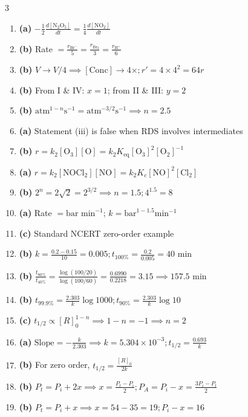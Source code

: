 \documentclass[11pt, a4paper]{article}
\begin{document}
\begin{multicols}{3}
\begin{enumerate}
    \item \textbf{(a)} $-\frac{1}{2}\frac{d[\text{N}_2\text{O}_5]}{dt} = \frac{1}{4}\frac{d[\text{NO}_2]}{dt}$
    \item \textbf{(b)} Rate $= \frac{r_{\text{Br}^-}}{5} = \frac{r_{\text{Br}_2}}{3} = \frac{r_{\text{H}^+}}{6}$
    \item \textbf{(b)} $V \to V/4 \implies [\text{Conc}] \to 4\times; r' = 4 \times 4^2 = 64r$
    \item \textbf{(b)} From I \& IV: $x=1$; from II \& III: $y=2$
    \item \textbf{(b)} $\text{atm}^{1-n}\text{s}^{-1} = \text{atm}^{-3/2}\text{s}^{-1} \implies n = 2.5$
    \item \textbf{(a)} Statement (iii) is false when RDS involves intermediates
    \item \textbf{(b)} $r = k_2[\text{O}_3][\text{O}] = k_2 K_{\text{eq}}[\text{O}_3]^2[\text{O}_2]^{-1}$
    \item \textbf{(a)} $r = k_2[\text{NOCl}_2][\text{NO}] = k_2 K_c[\text{NO}]^2[\text{Cl}_2]$
    \item \textbf{(b)} $2^n = 2\sqrt{2} = 2^{3/2} \implies n = 1.5; 4^{1.5} = 8$
    \item \textbf{(a)} Rate $= \text{bar min}^{-1}$; $k = \text{bar}^{1-1.5}\text{min}^{-1}$
    \item \textbf{(c)} Standard NCERT zero-order example
    \item \textbf{(b)} $k = \frac{0.2-0.15}{10} = 0.005; t_{100\%} = \frac{0.2}{0.005} = 40\text{ min}$
    \item \textbf{(b)} $\frac{t_{80\%}}{t_{40\%}} = \frac{\log(100/20)}{\log(100/60)} = \frac{0.6990}{0.2218} = 3.15 \implies 157.5\text{ min}$
    \item \textbf{(b)} $t_{99.9\%} = \frac{2.303}{k}\log 1000; t_{90\%} = \frac{2.303}{k}\log 10$
    \item \textbf{(c)} $t_{1/2} \propto [R]_0^{1-n} \implies 1-n = -1 \implies n = 2$
    \item \textbf{(a)} $\text{Slope} = -\frac{k}{2.303} \implies k = 5.304 \times 10^{-3}; t_{1/2} = \frac{0.693}{k}$
    \item \textbf{(b)} For zero order, $t_{1/2} = \frac{[R]_0}{2k}$
    \item \textbf{(b)} $P_t = P_i + 2x \implies x = \frac{P_t - P_i}{2}; P_A = P_i - x = \frac{3P_i - P_t}{2}$
    \item \textbf{(b)} $P_t = P_i + x \implies x = 54 - 35 = 19; P_i - x = 16$

\end{enumerate}
\end{multicols}
\end{document}
